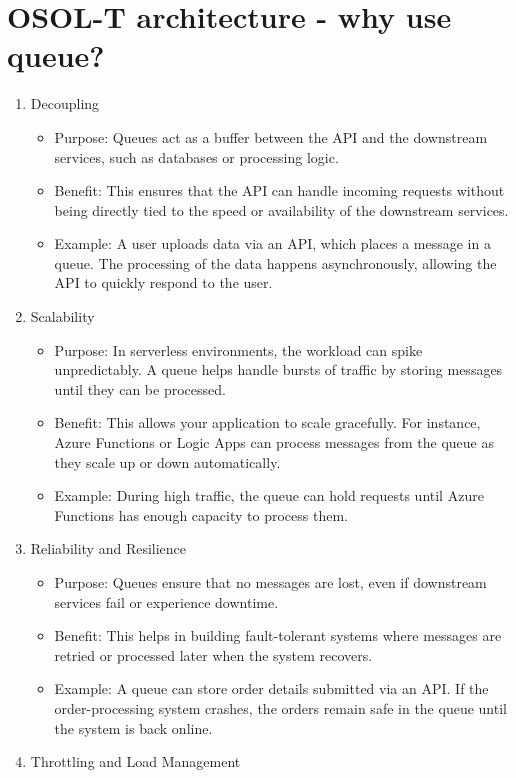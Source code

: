 \documentclass[a4paper,11pt]{article}
\begin{document}
\newpage

\section{OSOL-T architecture - why use queue?}
\begin{enumerate}
	\item Decoupling
	\begin{itemize}
		\item Purpose: Queues act as a buffer between the API and the downstream services, such as databases or processing logic.
		\item Benefit: This ensures that the API can handle incoming requests without being directly tied to the speed or availability of the downstream services.
		\item Example: A user uploads data via an API, which places a message in a queue. The processing of the data happens asynchronously, allowing the API to quickly respond to the user.
	\end{itemize}
	\item Scalability
	\begin{itemize}
		\item Purpose: In serverless environments, the workload can spike unpredictably. A queue helps handle bursts of traffic by storing messages until they can be processed.
		\item Benefit: This allows your application to scale gracefully. For instance, Azure Functions or Logic Apps can process messages from the queue as they scale up or down automatically.
		\item Example: During high traffic, the queue can hold requests until Azure Functions has enough capacity to process them.
	\end{itemize}
	\item Reliability and Resilience
	\begin{itemize}
		\item Purpose: Queues ensure that no messages are lost, even if downstream services fail or experience downtime.
		\item Benefit: This helps in building fault-tolerant systems where messages are retried or processed later when the system recovers.
		\item Example: A queue can store order details submitted via an API. If the order-processing system crashes, the orders remain safe in the queue until the system is back online.
	\end{itemize}
	\item Throttling and Load Management

\end{enumerate}
\end{document}
